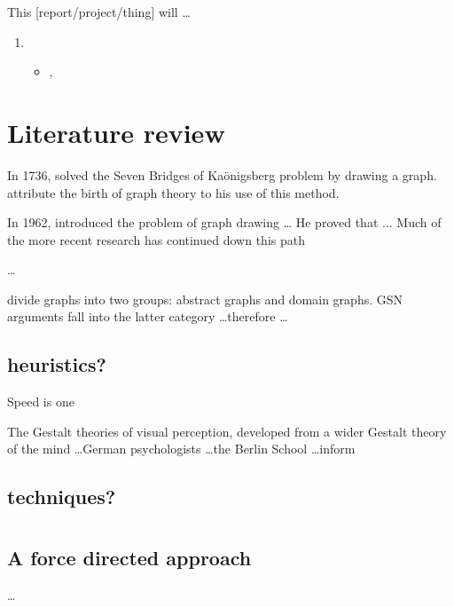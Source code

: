 \documentclass[authoryearcitations]{UoYCSproject}
\begin{document}
This [report/project/thing] will \ldots

	\begin{enumerate}
		\item \begin{itemize}
			\item ,
		\end{itemize}
	\end{enumerate}



\chapter{Literature review}

In 1736, \citet{euler} solved the Seven Bridges of Ka\"{o}nigsberg problem by drawing a graph.
\citet{ismail2009some}
attribute the birth of graph theory to his use of this method.

In 1962, \citet{tutte} introduced the problem of graph drawing \ldots
He proved that  ...
Much of the more recent research has continued down this path

\ldots

\citet{huang2007effects} divide graphs into two groups: abstract graphs and domain graphs.
GSN arguments fall into the latter category \ldots  therefore \ldots
{}


\section{heuristics?}

Speed is one 

The Gestalt theories of visual perception, developed from a wider Gestalt theory of the mind  \ldots German psychologists \ldots the Berlin School \ldots inform 


\section{techniques?}


\subsection{}

\citet{Gansner:1993:TDD:630795.631037}
 




\chapter{}



\section{A force directed approach}

\ldots











\end{document}
